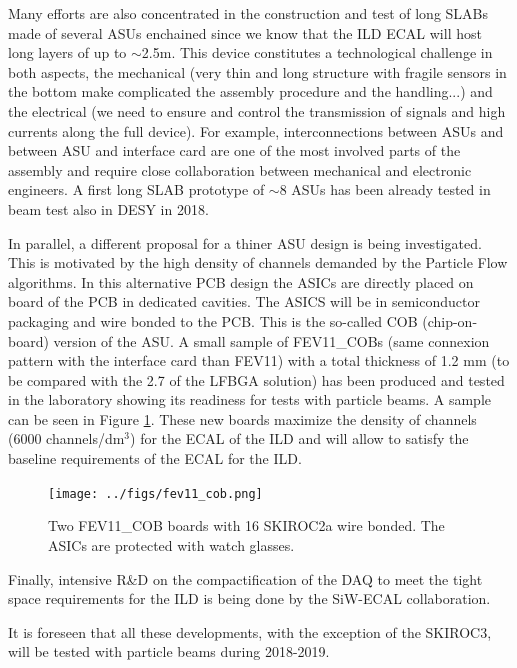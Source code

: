 \documentclass[a4paper,11pt]{article}
\begin{document}
Many efforts are also concentrated in the construction and test of long SLABs
made of several ASUs enchained since we know that the ILD ECAL will host long layers of up to $\sim$2.5m.
This device constitutes a technological challenge in both aspects, the mechanical
(very thin and long structure with fragile sensors in the bottom make complicated the assembly procedure and the handling...)
and the electrical (we need to ensure and control the transmission of signals and high currents along the full device).
For example, interconnections between ASUs and between ASU and interface card are one of
the most involved parts of the assembly
and require close collaboration between mechanical and electronic engineers.
A first long SLAB prototype
of $\sim8$ ASUs has been already tested in beam test also in DESY in 2018.

In parallel, a different proposal for a thiner ASU
design is being investigated. This is motivated by the high density of channels
demanded by the Particle Flow algorithms. 
In this alternative PCB design the ASICs
are directly placed on board of the PCB in dedicated cavities.
The ASICS will be in semiconductor packaging and wire bonded to the PCB. This is the so-called COB (chip-on-board) version of the ASU.
A small sample of FEV11\_COBs (same connexion pattern with the interface card than FEV11)
with a total thickness of 1.2 mm (to be compared with the 2.7 of the LFBGA solution)
has been produced and tested in the laboratory
showing its readiness for tests with particle beams. A sample can be seen in Figure \ref{cob}.
These new boards maximize the density of channels (6000 channels/dm$^{3}$) for the ECAL of the ILD
and will allow to satisfy the baseline requirements of the ECAL for the ILD.

\begin{figure}[!t]
  \centering
    \texttt{[image: ../figs/fev11\_cob.png]} 
  \caption{Two FEV11\_COB boards with 16 SKIROC2a wire bonded. The ASICs are protected with watch glasses.}
\label{cob}
\end{figure}

Finally, intensive R\&D on the compactification of
the DAQ to meet the tight space requirements for the ILD is being done by the SiW-ECAL collaboration.

It is foreseen that all these developments, with the exception of the SKIROC3, will be tested with particle beams during 2018-2019.


\acknowledgments
\end{document}

